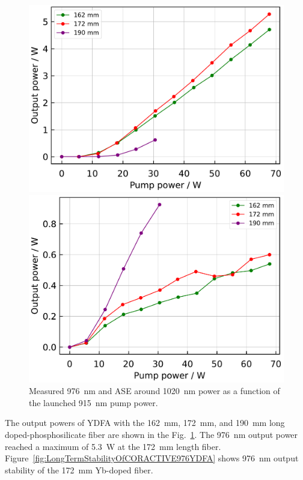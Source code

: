 \documentclass{osa-article}
\begin{document}
\begin{figure}[h]
  \begin{minipage}[b]{0.5\linewidth}
    \centering
    \includegraphics[keepaspectratio, width=0.9\linewidth]{./Figure/DCF-YB-20-128P-FAC172mm_SignalComparisonByLength_915Pump976Seed0.24W_Exp}
    \subcaption{}
  \end{minipage}
  \begin{minipage}[b]{0.5\linewidth}
    \centering
    \includegraphics[keepaspectratio, width=0.9\linewidth]{./Figure/DCF-YB-20-128P-FAC172mm_ASEComparisonByLength_915Pump976Seed0.24W_Exp}
    \subcaption{}
  \end{minipage}
  \caption{Measured \SI{976}{\nm} and ASE around \SI{1020}{\nm} power as a function of the launched \SI{915}{\nm} pump power.}
  \label{fig:OutputComparisonOfCORACTIVE976YDFA}
\end{figure}
The output powers of YDFA with the \SI{162}{\mm}, \SI{172}{\mm}, and \SI{190}{\mm} long doped-phosphosilicate fiber are shown in the Fig.~\ref{fig:OutputComparisonOfCORACTIVE976YDFA}.
The \SI{976}{nm} output power reached a maximum of \SI{5.3}{\W} at the \SI{172}{\mm} length fiber.
Figure~\ref{fig:LongTermStabilityOfCORACTIVE976YDFA} shows \SI{976}{\nm} output stability of the \SI{172}{\mm} Yb-doped fiber.
\end{document}
